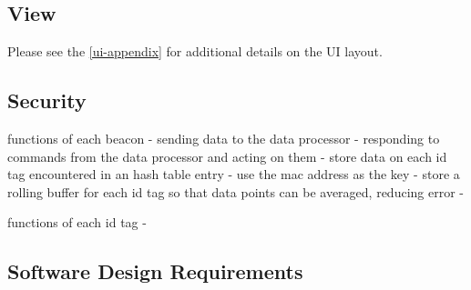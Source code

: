 \subsection{View}
Please see the \ref{ui-appendix} for additional details on the UI layout.


\subsection{Security}


\bigskip

functions of each beacon
	- sending data to the data processor
	- responding to commands from the data processor and acting on them
	- store data on each id tag encountered in an hash table entry - use the mac address as the key
	- store a rolling buffer for each id tag so that data points can be averaged, reducing error
	-

\bigskip

functions of each id tag
	-




\pagebreak
\subsection{Software Design Requirements}

